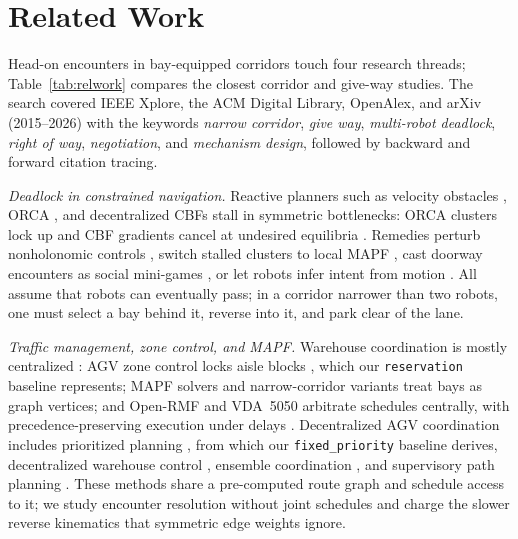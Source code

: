 \section{Related Work}\label{sec:rel}
Head-on encounters in bay-equipped corridors touch four research threads; Table~\ref{tab:relwork} compares the closest corridor and give-way studies. The search covered IEEE Xplore, the ACM Digital Library, OpenAlex, and arXiv (2015--2026) with the keywords \emph{narrow corridor}, \emph{give way}, \emph{multi-robot deadlock}, \emph{right of way}, \emph{negotiation}, and \emph{mechanism design}, followed by backward and forward citation tracing.

\emph{Deadlock in constrained navigation.} Reactive planners such as velocity obstacles \cite{fiorini1998motion}, ORCA \cite{vandenberg2011orca}, and decentralized CBFs \cite{wang2017safety} stall in symmetric bottlenecks: ORCA clusters lock up \cite{dergachev2021distributed} and CBF gradients cancel at undesired equilibria \cite{grover2023before}. Remedies perturb nonholonomic controls \cite{zheng2023deadlock}, switch stalled clusters to local MAPF \cite{dergachev2021distributed}, cast doorway encounters as social mini-games \cite{chandra2025deadlock,chandra2026social}, or let robots infer intent from motion \cite{alghamdi2025opinion}. All assume that robots can eventually pass; in a corridor narrower than two robots, one must select a bay behind it, reverse into it, and park clear of the lane.

\emph{Traffic management, zone control, and MAPF.} Warehouse coordination is mostly centralized \cite{fragapane2021planning}: AGV zone control locks aisle blocks \cite{fanti2002event}, which our \texttt{reservation} baseline represents; MAPF solvers \cite{sharon2015cbs,okumura2022pibt} and narrow-corridor variants \cite{experience2024narrow,macga2025} treat bays as graph vertices; and Open-RMF \cite{openrmf} and VDA~5050 \cite{vda5050,vanduijkeren2023industrial} arbitrate schedules centrally, with precedence-preserving execution under delays \cite{cap2016provably}. Decentralized AGV coordination includes prioritized planning \cite{cap2015prioritized}, from which our \texttt{fixed\_priority} baseline derives, decentralized warehouse control \cite{draganjac2016decentralized}, ensemble coordination \cite{digani2015ensemble}, and supervisory path planning \cite{proia2026decentralized}. These methods share a pre-computed route graph and schedule access to it; we study encounter resolution without joint schedules and charge the slower reverse kinematics that symmetric edge weights ignore.

